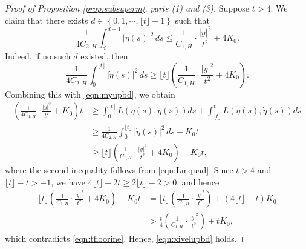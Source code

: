 \documentclass[reqno,11pt]{amsart}
\numberwithin{equation}{section}
\begin{document}
\begin{proof}[Proof of Proposition \ref{prop:subsuperm}, parts (1) and (3)]
Suppose $t>4$. We claim that there exists $d \in \left\{0, 1, \cdots, \lfloor t \rfloor - 1\right\}$ such that
\begin{equation}\label{eqn:xivelupbd}
\frac{1}{4C_{2,H}}\int_d^{d+1} \left|\dot{\eta}(s)\right|^2 \,ds \leq \frac{1}{C_{1,H} }\cdot \frac{|y|^2}{t^2} + 4K_0.
\end{equation}
Indeed, if no such $d$ existed, then
\[
\frac{1}{4C_{2,H}}\int_0^{\lfloor t \rfloor} \left|\dot{\eta}(s)\right|^2 \,ds \geq \lfloor t \rfloor\left(\frac{1}{C_{1,H} }\cdot \frac{|y|^2}{t^2} + 4K_0\right).
\]
Combining this with \eqref{eqn:myupbd}, we obtain
\begin{equation}\label{eqn:tfloorine}
\begin{aligned}
\left(\frac{1}{4C_{1,H}} \cdot \frac{|y|^2}{t^2}+K_0\right)t &\geq \int_0^{\lfloor t\rfloor} L \left(\eta(s), \dot{\eta}(s)\right)ds+\int_{\lfloor t\rfloor}^t L \left(\eta(s), \dot{\eta}(s)\right)ds\\
& \geq \frac{1}{4C_{2,H}}\int_0^{\lfloor t \rfloor} \left|\dot{\eta}(s)\right|^2 \,ds -K_0 t\\
& \geq \lfloor t \rfloor\left(\frac{1}{C_{1,H} }\cdot \frac{|y|^2}{t^2} + 4K_0\right)-K_0 t,
\end{aligned}
\end{equation}
where the second inequality follows from \eqref{eqn:Lmquad}. Since $t>4$ and $\lfloor t \rfloor  - t > -1 $, we have $4 \lfloor t \rfloor -2t \geq 2 \lfloor t \rfloor -2 >0$, and hence
\[
\begin{aligned}
\lfloor t \rfloor\left(\frac{1}{C_{1,H} }\cdot \frac{|y|^2}{t^2} + 4K_0\right)-K_0 t & =\lfloor t \rfloor\left(\frac{1}{C_{1,H} }\cdot \frac{|y|^2}{t^2} \right) + (4 \lfloor t \rfloor -t )K_0 \\
&> \frac{t}{4}\left(\frac{1}{C_{1,H} }\cdot \frac{|y|^2}{t^2} \right) +tK_0,
\end{aligned}
\]
which contradicts \eqref{eqn:tfloorine}. Hence, \eqref{eqn:xivelupbd} holds.


\end{proof}
\end{document}
